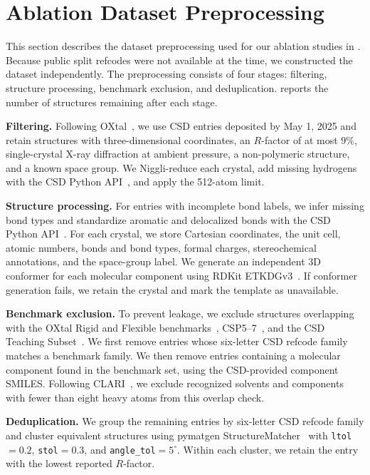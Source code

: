 \section{Ablation Dataset Preprocessing}
\label{app:dataset-preprocessing}

This section describes the dataset preprocessing used for our ablation studies in . 
Because public split refcodes were not available at the time, we constructed the 
dataset independently. The preprocessing consists of four stages: filtering, structure 
processing, benchmark exclusion, and deduplication. 
reports the number of structures remaining after each stage.

\textbf{Filtering.}
Following OXtal~\citep{jin2025oxtal}, we use CSD entries deposited by May 1,
2025 and retain structures with three-dimensional coordinates, an $R$-factor of at most $9\%$, single-crystal X-ray diffraction at ambient pressure, a non-polymeric structure, and a known space group. We
Niggli-reduce each crystal, add missing hydrogens with the CSD Python API~\citep{sykes2024scripting}, and apply the 512-atom limit.

\textbf{Structure processing.}
For entries with incomplete bond labels, we infer missing bond types
and standardize aromatic and delocalized bonds with the CSD Python API~\citep{sykes2024scripting}. 
For each crystal, we store Cartesian coordinates, the unit cell, atomic numbers, bonds and bond types, 
formal charges, stereochemical annotations, and the space-group label. We generate an independent
3D conformer for each molecular component using RDKit ETKDGv3~\citep{rdkit,wang2020improving}.
If conformer generation fails, we retain the crystal and mark the template as unavailable.

\textbf{Benchmark exclusion.}
To prevent leakage, we exclude structures overlapping with the OXtal Rigid and
Flexible benchmarks~\citep{jin2025oxtal}, CSP5--7~\citep{bardwell2011fifth,
reilly2016sixth,hunnisett2024seventhgeneration}, and the CSD Teaching
Subset~\citep{battle2010applications,lo2026clari}. We first remove entries whose
six-letter CSD refcode family matches a benchmark family. We then remove entries
containing a molecular component found in the benchmark set, using the CSD-provided
component SMILES. Following CLARI~\citep{lo2026clari}, we exclude recognized solvents 
and components with fewer than eight heavy atoms from this overlap check.

\textbf{Deduplication.}
We group the remaining entries by six-letter CSD refcode family and cluster
equivalent structures using pymatgen StructureMatcher~\citep{ong2013pymatgen}
with \texttt{ltol}$=0.2$, \texttt{stol}$=0.3$, and \texttt{angle\_tol}$=5^\circ$. 
Within each cluster, we retain the entry with the lowest reported $R$-factor.


